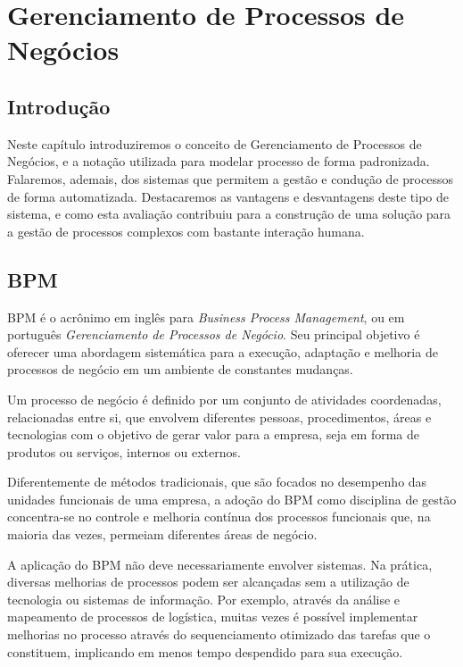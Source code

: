 \chapter{Gerenciamento de Processos de Negócios}\label{chp:bpm}

\section{Introdução}\label{sec:bpm-intro}

Neste capítulo introduziremos o conceito de Gerenciamento de Processos de Negócios, e a notação utilizada para modelar processo de forma padronizada. Falaremos, ademais, dos sistemas que permitem a gestão e condução de processos de forma automatizada. Destacaremos as vantagens e desvantagens deste tipo de sistema, e como esta avaliação contribuiu para a construção de uma solução para a gestão de processos complexos com bastante interação humana.

\section{BPM}\label{sec:bpm-bpm}
BPM\cite{bpm} é o acrônimo em inglês para \textit{Business Process Management}, ou em português \textit{Gerenciamento de Processos de Negócio}. Seu principal objetivo é oferecer uma abordagem sistemática para a execução, adaptação e melhoria de processos de negócio em um ambiente de constantes mudanças. 

Um processo de negócio é definido por um conjunto de atividades coordenadas, relacionadas entre si, que envolvem diferentes pessoas, procedimentos, áreas e tecnologias com o objetivo de gerar valor para a empresa, seja em forma de produtos ou serviços, internos ou externos.

Diferentemente de métodos tradicionais, que são focados no desempenho das unidades funcionais de uma empresa, a adoção do BPM como disciplina de gestão concentra-se no controle e melhoria contínua dos processos funcionais que, na maioria das vezes, permeiam diferentes áreas de negócio.

A aplicação do BPM não deve necessariamente envolver sistemas. Na prática, diversas melhorias de processos podem ser alcançadas sem a utilização de tecnologia ou sistemas de informação. Por exemplo, através da análise e mapeamento de processos de logística, muitas vezes é possível implementar melhorias no processo através do sequenciamento otimizado das tarefas que o constituem, implicando em menos tempo despendido para sua execução.

